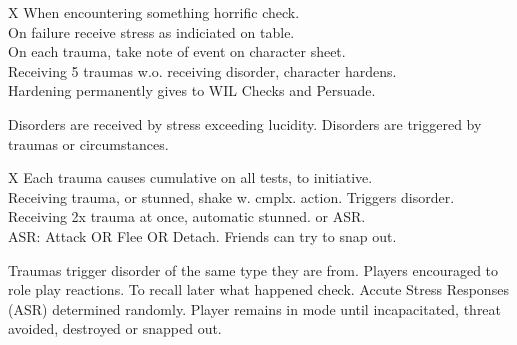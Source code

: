 \bigskip


\begin{eptable}{ X }
   When encountering something horrific  check.\\
   On failure receive stress as indiciated on table.\\
   On each trauma, take note of event on character sheet.\\
   Receiving \num{5} traumas w.o. receiving disorder, character hardens.\\
   Hardening permanently gives  to WIL Checks and Persuade.\\
\end{eptable}

\begin{itemize}
    \itembox Disorders are received by stress exceeding lucidity.
    \itembox Disorders are triggered by traumas or circumstances.
\end{itemize}

\bigskip

\begin{eptable}{ X }
   Each trauma causes cumulative  on all tests,  to initiative.\\
   Receiving trauma,  or stunned, shake w. cmplx. action. Triggers disorder.\\
   Receiving 2x trauma at once, automatic stunned.  or ASR.\\
   ASR: Attack OR Flee OR Detach. Friends can try  to snap out.\\
\end{eptable}

\begin{itemize}
    \itembox Traumas trigger disorder of the same type they are from. Players encouraged to role play reactions.
    \itembox To recall later what happened  check.
    \itembox Accute Stress Responses (ASR) determined randomly. Player remains in mode until incapacitated, threat avoided, destroyed or snapped out.
\end{itemize}


\bigskip


